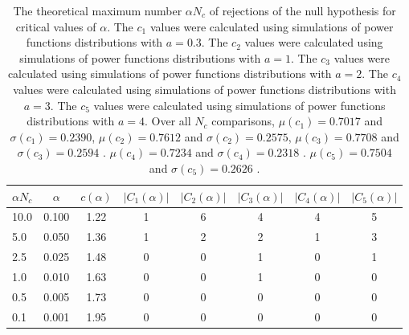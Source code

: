 \begin{table}[h!]
\begin{center}
\begin{tabular}{| l | c | c | c | c | c | c | c |}\hline
$\alpha N_c$ & $\alpha$ & $c(\alpha)$ & $|C_1(\alpha)|$ & $|C_2(\alpha)|$ & $|C_3(\alpha)|$ & $|C_4(\alpha)|$ & $|C_5(\alpha)|$ \\\hline\hline
10.0 & 0.100 & 1.22 & 1 & 6 & 4 & 4 & 5 \\\hline
5.0 & 0.050 & 1.36 & 1 & 2 & 2 & 1 & 3 \\\hline
2.5 & 0.025 & 1.48 & 0 & 0 & 1 & 0 & 1 \\\hline
1.0 & 0.010 & 1.63 & 0 & 0 & 1 & 0 & 0 \\\hline
0.5 & 0.005 & 1.73 & 0 & 0 & 0 & 0 & 0 \\\hline
0.1 & 0.001 & 1.95 & 0 & 0 & 0 & 0 & 0 \\\hline
\end{tabular}
\caption{The theoretical maximum number $\alpha N_c$ of rejections
of the null hypothesis for critical values of $\alpha$.
The $c_1$ values were calculated using simulations of power functions distributions with $a=0.3$.
The $c_2$ values were calculated using simulations of power functions distributions with $a=1$.
The $c_3$ values were calculated using simulations of power functions distributions with $a=2$.
The $c_4$ values were calculated using simulations of power functions distributions with $a=3$.
The $c_5$ values were calculated using simulations of power functions distributions with $a=4$.
Over all $N_c$ comparisons,
 $\mu(c_1)=0.7017$ and $\sigma(c_1)=0.2390$,
 $\mu(c_2)=0.7612$ and $\sigma(c_2)=0.2575$,
 $\mu(c_3)=0.7708$ and $\sigma(c_3)=0.2594$ .
 $\mu(c_4)=0.7234$ and $\sigma(c_4)=0.2318$ .
 $\mu(c_5)=0.7504$ and $\sigma(c_5)=0.2626$ .
}
\end{center}
\end{table}